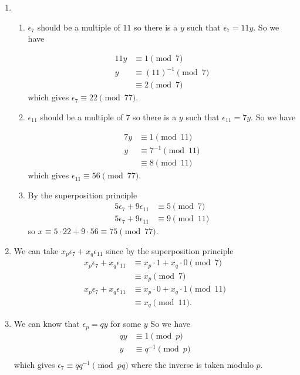 \begin{solution}
  \begin{enumerate}
    \item
      \begin{enumerate}
        \item
          $\epsilon_7$ should be a multiple of $11$ so there is a $y$ such
          that $\epsilon_7 = 11y$.
          So we have

          \begin{align*}
            11y & \equiv 1 \pmod{7}\\
              y & \equiv (11)^{-1} \pmod{7}\\
                & \equiv 2 \pmod{7}
          \end{align*}
          which gives $\epsilon_7 \equiv 22 \pmod{77}$.
        \item
          $\epsilon_{11}$ should be a multiple of $7$ so there is a $y$ such
          that $\epsilon_{11} = 7y$.
          So we have

          \begin{align*}
            7y & \equiv 1 \pmod{11}\\
             y & \equiv 7^{-1} \pmod{11}\\
               & \equiv 8 \pmod{11}
          \end{align*}
          which gives $\epsilon_{11} \equiv 56 \pmod{77}$.
        \item
          By the superposition principle
          \begin{align*}
            5\epsilon_7 + 9\epsilon_{11} & \equiv 5 \pmod{7}\\
            5\epsilon_7 + 9\epsilon_{11} & \equiv 9 \pmod{11}
          \end{align*}
          so $x \equiv 5 \cdot 22 + 9 \cdot 56 \equiv 75 \pmod{77}$.
        \end{enumerate}
      \item
        We can take $x_p\epsilon_7 + x_q\epsilon_{11}$
        since by the superposition principle
        \begin{align*}
          x_p\epsilon_7 + x_q\epsilon_{11} & \equiv x_p \cdot 1 + x_q \cdot 0 \pmod{7}\\
                                           & \equiv x_p \pmod{7}\\
          x_p\epsilon_7 + x_q\epsilon_{11} & \equiv x_p \cdot 0 + x_q \cdot 1 \pmod{11}\\
                                           & \equiv x_q \pmod{11}.
        \end{align*}
      \item
        We can know that $\epsilon_p = qy$ for some $y$
        So we have
        \begin{align*}
          qy & \equiv 1 \pmod{p}\\
           y & \equiv q^{-1} \pmod{p}\\
        \end{align*}
        which gives $\epsilon_7 \equiv qq^{-1} \pmod{pq}$
        where the inverse is taken modulo $p$.


\end{enumerate}
\end{solution}
